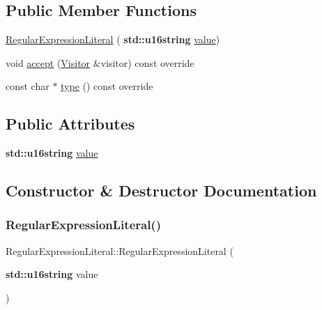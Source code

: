 \subsection*{Public Member Functions}
\begin{DoxyCompactItemize}
\item 
\hyperlink{struct_regular_expression_literal_a1a52f1ff71def31547c2e9d9eaa9e9ad}{Regular\+Expression\+Literal} (\textbf{ std\+::u16string} \hyperlink{struct_regular_expression_literal_a921511a495890879867f11d3d1c385fc}{value})
\item 
void \hyperlink{struct_regular_expression_literal_a0df8cb8e68e12de1751821c9a1c60617}{accept} (\hyperlink{struct_visitor}{Visitor} \&visitor) const override
\item 
const char $\ast$ \hyperlink{struct_regular_expression_literal_ae63701a6b14a5a83cde987e663acf8bd}{type} () const override
\end{DoxyCompactItemize}
\subsection*{Public Attributes}
\begin{DoxyCompactItemize}
\item 
\textbf{ std\+::u16string} \hyperlink{struct_regular_expression_literal_a921511a495890879867f11d3d1c385fc}{value}
\end{DoxyCompactItemize}


\subsection{Constructor \& Destructor Documentation}
\mbox{\label{struct_regular_expression_literal_a1a52f1ff71def31547c2e9d9eaa9e9ad}} 
\subsubsection{\texorpdfstring{Regular\+Expression\+Literal()}{RegularExpressionLiteral()}}
{\footnotesize\ttfamily Regular\+Expression\+Literal\+::\+Regular\+Expression\+Literal (\begin{DoxyParamCaption}\item[{\textbf{ std\+::u16string}}]{value }\end{DoxyParamCaption})\hspace{0.3cm}{\ttfamily [inline]}}



